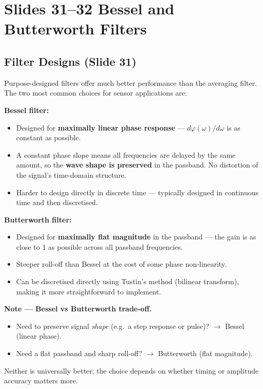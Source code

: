 \documentclass[12pt, a4paper]{article}
\begin{document}
\section*{Slides 31--32 \quad Bessel and Butterworth Filters}

\subsection*{Filter Designs (Slide 31)}

Purpose-designed filters offer much better performance than the averaging
filter. The two most common choices for sensor applications are:

\textbf{Bessel filter:}
\begin{itemize}[leftmargin=1.5em]
  \item Designed for \textbf{maximally linear phase response} ---
        $d\varphi(\omega)/d\omega$ is as constant as possible.
  \item A constant phase slope means all frequencies are delayed by the
        same amount, so the \textbf{wave shape is preserved} in the
        passband. No distortion of the signal's time-domain structure.
  \item Harder to design directly in discrete time --- typically designed
        in continuous time and then discretised.
\end{itemize}

\textbf{Butterworth filter:}
\begin{itemize}[leftmargin=1.5em]
  \item Designed for \textbf{maximally flat magnitude} in the passband ---
        the gain is as close to 1 as possible across all passband
        frequencies.
  \item Steeper roll-off than Bessel at the cost of some phase non-linearity.
  \item Can be discretised directly using Tustin's method (bilinear
        transform), making it more straightforward to implement.
\end{itemize}

\begin{notebox}
  \textbf{Note --- Bessel vs Butterworth trade-off.}
  \begin{itemize}[leftmargin=1.5em, topsep=2pt]
    \item Need to preserve signal \emph{shape} (e.g.\ a step response or
          pulse)? $\to$ Bessel (linear phase).
    \item Need a flat passband and sharp roll-off? $\to$ Butterworth
          (flat magnitude).
  \end{itemize}
  Neither is universally better; the choice depends on whether timing
  or amplitude accuracy matters more.
\end{notebox}
\end{document}
